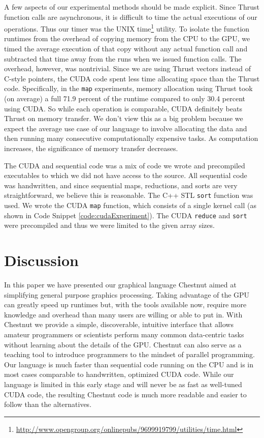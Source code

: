 \documentclass[twocolumn]{article}
\renewcommand{\|}{\origbar} %
\newcommand{\code}[1]{\texttt{#1}}
\begin{document}
A few aspects of our experimental methods should be made explicit. Since Thrust function calls are asynchronous, it is difficult to time the actual executions of our operations. Thus our timer was the UNIX time\footnote{\url{http://www.opengroup.org/onlinepubs/9699919799/utilities/time.html}} utility. To isolate the function runtimes from the overhead of copying memory from the CPU to the GPU, we timed the average execution of that copy without any actual function call and subtracted that time away from the runs when we issued function calls. The overhead, however, was nontrivial. Since we are using Thrust vectors instead of C-style pointers, the CUDA code spent less time allocating space than the Thrust code. Specifically, in the \code{map} experiments, memory allocation using Thrust took (on average) a full 71.9 percent of the runtime compared to only 30.4 percent using CUDA. So while each operation is comparable, CUDA definitely beats Thrust on memory transfer. We don't view this as a big problem because we expect the average use case of our language to involve allocating the data and then running many consecutive computationally expensive tasks. As computation increases, the significance of memory transfer decreases.

The CUDA and sequential code was a mix of code we wrote and precompiled executables to which we did not have access to the source. All sequential code was handwritten, and since sequential maps, reductions, and sorts are very straightforward, we believe this is reasonable. The C++ STL \code{sort} function was used. We wrote the CUDA \code{map} function, which consists of a single kernel call (as shown in Code Snippet \ref{code:cudaExperiment}). The CUDA \code{reduce} and \code{sort} were precompiled and thus we were limited to the given array sizes. 

\section{Discussion}
\label{sec:discussion}

In this paper we have presented our graphical language Chestnut aimed at simplifying general purpose graphics processing. Taking advantage of the GPU can greatly speed up runtimes but, with the tools available now, require more knowledge and overhead than many users are willing or able to put in. With Chestnut we provide a simple, discoverable, intuitive interface that allows amateur programmers or scientists perform many common data-centric tasks without learning about the details of the GPU. Chestnut can also serve as a teaching tool to introduce programmers to the mindset of parallel programming. Our language is much faster than sequential code running on the CPU and is in most cases comparable to handwritten, optimized CUDA code. While our language is limited in this early stage and will never be as fast as well-tuned CUDA code, the resulting Chestnut code is much more readable and easier to follow than the alternatives. 
\end{document}
